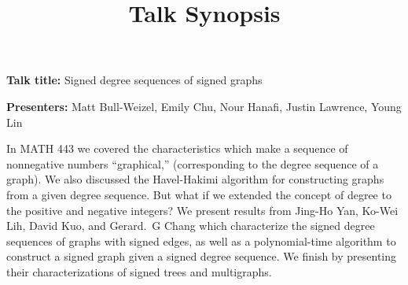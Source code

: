 \documentclass[12pt]{article}
\title{Talk Synopsis}
\begin{document}
\maketitle

\textbf{Talk title:} Signed degree sequences of signed graphs

\textbf{Presenters:} Matt Bull-Weizel, Emily Chu, Nour Hanafi, Justin Lawrence,
Young Lin

\medskip

In MATH 443 we covered the characteristics which make a sequence of nonnegative
numbers ``graphical,'' (corresponding to the degree sequence of a graph). We
also discussed the Havel-Hakimi algorithm for constructing graphs from a given
degree sequence. But what if we extended the concept of degree to the positive
and negative integers? We present results from Jing-Ho Yan, Ko-Wei Lih, David
Kuo, and Gerard.\ G Chang which characterize the signed degree sequences of
graphs with signed edges, as well as a polynomial-time algorithm to construct a
signed graph given a signed degree sequence. We finish by presenting their
characterizations of signed trees and multigraphs.
\end{document}
